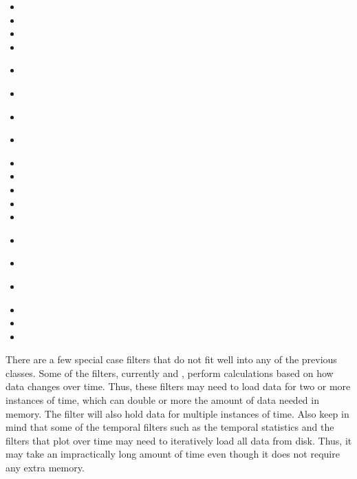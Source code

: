 \begin{multicols}{2}
  \begin{itemize}
  \item {}
  \item {}
  \item {}
  \item {}
  \item {}~\extractGroup
  \item {}~\glyph
  \item {}~\group
  \item {}~\histogram
  \item {}
  \item {}
  \item {}
  \item {}
  \item {}
  \item {}~\plotOverLine
  \item {}~\plotSelectionOverTime
  \item {}~\probe
  \item {}
  \item {}
  \item {}
  \end{itemize}
\end{multicols}

There are a few special case filters that do not fit well into any of the
previous classes.  Some of the filters, currently  and , perform calculations based on
how data changes over time.  Thus, these filters may need to load data for
two or more instances of time, which can double or more the amount of data
needed in memory.  The  filter will also hold data for
multiple instances of time.  Also keep in mind that some of the temporal
filters such as the temporal statistics and the filters that plot over time
may need to iteratively load all data from disk.  Thus, it may take an
impractically long amount of time even though it does not require any extra
memory.

